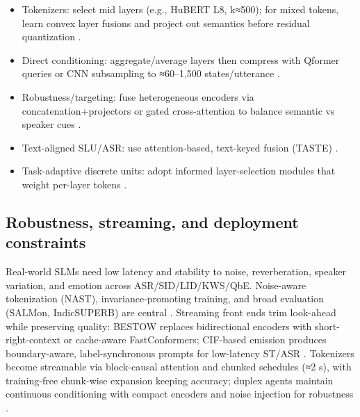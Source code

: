 \documentclass{article}
\begin{document}
\begin{itemize}
  \item Tokenizers: select mid layers (e.g., HuBERT L8, k≈500); for mixed tokens, learn convex layer fusions and project out semantics before residual quantization \cite{hussein2025hasrdhierarchicalacousticsemanticreprese,chen2023reducingbarriersselfsupervisedlearninghu}.
  \item Direct conditioning: aggregate/average layers then compress with Qformer queries or CNN subsampling to ≈60–1{,}500 states/utterance \cite{lu2024destaenhancingspeechlanguagemodelsthroug}.
  \item Robustness/targeting: fuse heterogeneous encoders via concatenation+projectors or gated cross-attention to balance semantic vs speaker cues \cite{mei2025shnumultilingualconversationalspeechreco,lin2025dkusystemmultispeakerautomaticspeechreco}.
  \item Text-aligned SLU/ASR: use attention-based, text-keyed fusion (TASTE) \cite{tseng2025tastetextalignedspeechtokenizationembedd}.
  \item Task-adaptive discrete units: adopt informed layer-selection modules that weight per-layer tokens \cite{mousavi2024howshouldweextractdiscreteaudiotokenssel}.
\end{itemize}

\subsection{Robustness, streaming, and deployment constraints} \label{subsec:Robustness, streaming, and deployment constraints}
Real-world SLMs need low latency and stability to noise, reverberation, speaker variation, and emotion across ASR/SID/LID/KWS/QbE. Noise-aware tokenization (NAST), invariance-promoting training, and broad evaluation (SALMon, IndicSUPERB) are central \cite{messica2024nastnoiseawarespeechtokenizationlanguage,maimon2025salmonsuiteacousticlanguagemodelevaluati,entry2025indicsuperbspeechprocessinguniversalperf}. Streaming front ends trim look-ahead while preserving quality: BESTOW replaces bidirectional encoders with short-right-context or cache-aware FastConformers; CIF-based emission produces boundary-aware, label-synchronous prompts for low-latency ST/ASR \cite{chen2024bestowefficientstreamablespeechlanguagem,deng2025simuls2sllmunlockingsimultaneousinferenc}. Tokenizers become streamable via block-causal attention and chunked schedules (≈2 s), with training-free chunk-wise expansion keeping accuracy; duplex agents maintain continuous conditioning with compact encoders and noise injection for robustness \cite{zeng2024scalingspeechtextpretrainingsyntheticint,chang2024dcspinspeakerinvariantspeechtokenizerspo,ma2024languagemodelcanlistenwhilespeaking}.
\end{document}
